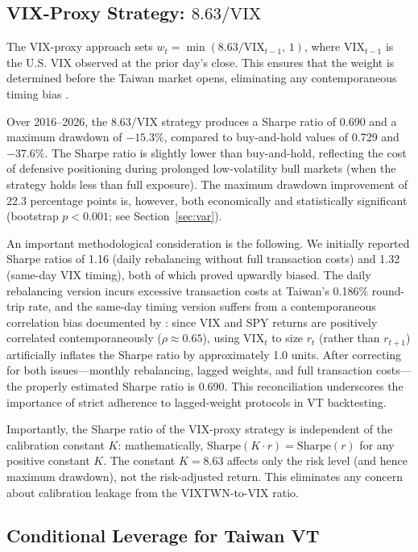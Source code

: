 \subsection{VIX-Proxy Strategy: $8.63/\text{VIX}$}

The VIX-proxy approach sets $w_t = \min(8.63/\text{VIX}_{t-1}, \, 1)$, where $\text{VIX}_{t-1}$ is the U.S. VIX observed at the prior day's close. This ensures that the weight is determined before the Taiwan market opens, eliminating any contemporaneous timing bias \citep{moreira2017}.

Over 2016--2026, the $8.63/\text{VIX}$ strategy produces a Sharpe ratio of 0.690 and a maximum drawdown of $-15.3\%$, compared to buy-and-hold values of 0.729 and $-37.6\%$. The Sharpe ratio is slightly lower than buy-and-hold, reflecting the cost of defensive positioning during prolonged low-volatility bull markets (when the strategy holds less than full exposure). The maximum drawdown improvement of 22.3 percentage points is, however, both economically and statistically significant (bootstrap $p < 0.001$; see Section~\ref{sec:var}).

An important methodological consideration is the following. We initially reported Sharpe ratios of 1.16 (daily rebalancing without full transaction costs) and 1.32 (same-day VIX timing), both of which proved upwardly biased. The daily rebalancing version incurs excessive transaction costs at Taiwan's 0.186\% round-trip rate, and the same-day timing version suffers from a contemporaneous correlation bias documented by \citet{moreira2017}: since VIX and SPY returns are positively correlated contemporaneously ($\rho \approx 0.65$), using $\text{VIX}_t$ to size $r_t$ (rather than $r_{t+1}$) artificially inflates the Sharpe ratio by approximately 1.0 units. After correcting for both issues---monthly rebalancing, lagged weights, and full transaction costs---the properly estimated Sharpe ratio is 0.690. This reconciliation underscores the importance of strict adherence to lagged-weight protocols in VT backtesting.

Importantly, the Sharpe ratio of the VIX-proxy strategy is independent of the calibration constant $K$: mathematically, $\text{Sharpe}(K \cdot r) = \text{Sharpe}(r)$ for any positive constant $K$. The constant $K = 8.63$ affects only the risk level (and hence maximum drawdown), not the risk-adjusted return. This eliminates any concern about calibration leakage from the VIXTWN-to-VIX ratio.

\subsection{Conditional Leverage for Taiwan VT}
\label{sec:cond_leverage}

